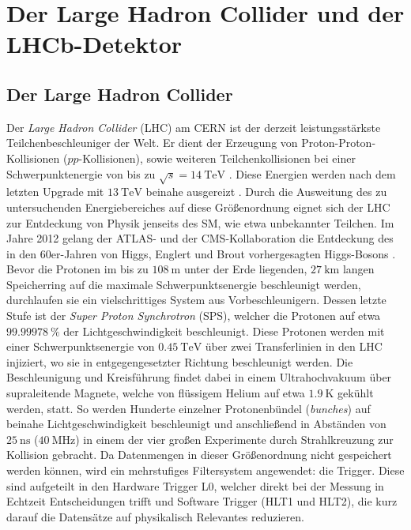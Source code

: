 \chapter{Der Large Hadron Collider und der LHCb-Detektor}
\label{chap:3}
%
\section{Der Large Hadron Collider}
%
Der \textit{Large Hadron Collider} (LHC) am CERN ist der derzeit leistungsstärkste Teilchenbeschleuniger der Welt. Er dient der Erzeugung von Proton-Proton-Kollisionen ($pp$-Kollisionen), sowie weiteren Teilchenkollisionen bei einer Schwerpunktenergie von bis zu $\sqrt{s}=\SI{14}{\tera\electronvolt}$ \cite{lhc}. Diese Energien werden nach dem letzten Upgrade mit $\SI{13}{\tera\electronvolt}$ beinahe ausgereizt \cite{lhc}. Durch die Ausweitung des zu untersuchenden Energiebereiches auf diese Größenordnung eignet sich der LHC zur Entdeckung von Physik jenseits des SM, wie etwa unbekannter Teilchen. Im Jahre 2012 gelang der ATLAS- und der CMS-Kollaboration die Entdeckung des in den 60er-Jahren von Higgs, Englert und Brout vorhergesagten Higgs-Bosons \cite{higgs_atlas}\cite{higgs_cms}.
Bevor die Protonen im bis zu $\SI{108}{\meter}$ unter der Erde liegenden, $\SI{27}{\kilo\meter}$ langen Speicherring auf die maximale Schwerpunktsenergie beschleunigt werden, durchlaufen sie ein vielschrittiges System aus Vorbeschleunigern. Dessen letzte Stufe ist der \textit{Super Proton Synchrotron} (SPS), welcher die Protonen auf etwa $\SI{99,99978}{\percent}$ der Lichtgeschwindigkeit beschleunigt\cite{lhc}. Diese Protonen werden mit einer Schwerpunktsenergie von $\SI{0,45}{\tera\electronvolt}$ über zwei Transferlinien in den LHC injiziert, wo sie in entgegengesetzter Richtung beschleunigt werden. Die Beschleunigung und Kreisführung findet dabei in einem Ultrahochvakuum über supraleitende Magnete, welche von flüssigem Helium auf etwa $\SI{1,9}{\kelvin}$ gekühlt werden, statt. So werden Hunderte einzelner Protonenbündel (\textit{bunches}) auf beinahe Lichtgeschwindigkeit beschleunigt und anschließend in Abständen von $\SI{25}{\nano\second}$
($\SI{40}{\mega\hertz}$) in einem der vier großen Experimente durch Strahlkreuzung zur Kollision gebracht. Da Datenmengen in dieser Größenordnung nicht gespeichert werden können, wird ein mehrstufiges Filtersystem angewendet: die Trigger. Diese sind aufgeteilt in den Hardware Trigger \textsc{L0}, welcher direkt bei der Messung in Echtzeit Entscheidungen trifft und Software Trigger (\textsc{HLT1} und \textsc{HLT2}), die kurz darauf die Datensätze auf physikalisch Relevantes reduzieren.
%
